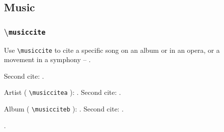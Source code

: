 \documentclass{article}
\newcommand\showcmnd[1]{%
\textbackslash\texttt{#1}%
}
\newcommand\showcmndc[1]{%
\texttt{\colorbox{blue!20!green!12}{\textbackslash#1}}%
}
\newcommand\cbb[1]{%
\colorbox{red!20!yellow!25}{#1}%
}
\begin{document}
\tableofcontents

\subsection{Music}
\subsubsection{\showcmnd{musiccite}}
Use \showcmndc{musiccite} to cite a specific song on an album or in an opera, or a movement in a symphony -- {\color{blue}}.


Second cite: .

Artist (\showcmndc{musiccitea}): 
 \cbb{}.
 Second cite: 
 \cbb{\musiccitea{jcollins}}.

Album (\showcmndc{musicciteb}):
\cbb{}. 
Second cite: 
\cbb{\musicciteb{judith}}.


.


\newrefcontext[sorting=sortmusic]
\printbibliography[
	heading=subbibliography,%
	type=bibmusic,
	title={Music}
	]
\end{document}
